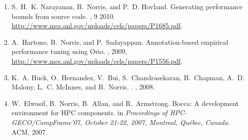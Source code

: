 \begin{enumerate}

\item
S.~H.~K. Narayanan, B.~Norris, and P.~D. Hovland.
 \newblock Generating performance bounds from source code.
 , 9 2010.
  \url{http://www.mcs.anl.gov/uploads/cels/papers/P1685.pdf}.



\item
A.~Hartono, B.~Norris, and P.~Sadayappan.
\newblock Annotation-based empirical performance tuning using {Orio}.
, 2009,
    \url{http://www.mcs.anl.gov/uploads/cels/papers/P1556.pdf}.

\item 
K.~A. Huck, O.~Hernandez, V.~Bui, S.~Chandrasekaran, B.~Chapman, A.~D. Malony,
  L.~C. McInnes, and B.~Norris.
.
, 2008.

\item
W.~Elwasif, B.~Norris, B.~Allan, and R.~Armstrong.
\newblock Bocca: {A} development environment for HPC components.
\newblock in {\em Proceedings of HPC-GECO/CompFrame'07, October
  21-22, 2007, Montreal, Qu\'ebec, Canada}. ACM, 2007.


\end{enumerate}
